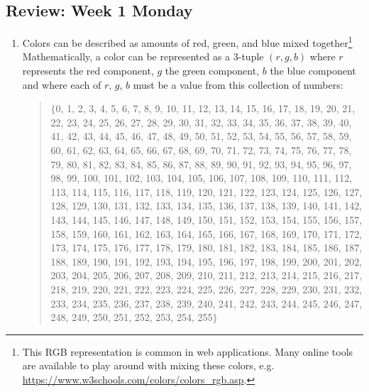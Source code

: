 \documentclass[12pt, oneside]{article}
\begin{document}
\subsection*{Review: Week 1 Monday}
\begin{enumerate}
    \item {

Colors can be described as amounts of red, green, and blue mixed together\footnote{This RGB representation
is common in web applications.  Many online tools are available to play around with mixing these colors, 
e.g. \url{https://www.w3schools.com/colors/colors_rgb.asp}. }
Mathematically, a color can be represented as a $3$-tuple $(r, g, b)$ where $r$
represents the red component, $g$ the green component, $b$ the blue component and where each of $r$, $g$, $b$ must
be a value from this collection of numbers:
\begin{quote}
$\{$0, 1, 2, 3, 4, 5, 6, 7, 8, 9, 10, 11, 12, 13, 14, 15, 16, 17, 18, 19, 20, 21, 22, 23, 24, 25, 26, 27, 28, 29, 30, 31, 32, 33, 34, 35, 36, 37, 38, 39, 40, 41, 42, 43, 44, 45, 46, 47, 48, 49, 50, 51, 52, 53, 54, 55, 56, 57, 58, 59, 60, 61, 62, 63, 64, 65, 66, 67, 68, 69, 70, 71, 72, 73, 74, 75, 76, 77, 78, 79, 80, 81, 82, 83, 84, 85, 86, 87, 88, 89, 90, 91, 92, 93, 94, 95, 96, 97, 98, 99, 100, 101, 102, 103, 104, 105, 106, 107, 108, 109, 110, 111, 112, 113, 114, 115, 116, 117, 118, 119, 120, 121, 122, 123, 124, 125, 126, 127, 128, 129, 130, 131, 132, 133, 134, 135, 136, 137, 138, 139, 140, 141, 142, 143, 144, 145, 146, 147, 148, 149, 150, 151, 152, 153, 154, 155, 156, 157, 158, 159, 160, 161, 162, 163, 164, 165, 166, 167, 168, 169, 170, 171, 172, 173, 174, 175, 176, 177, 178, 179, 180, 181, 182, 183, 184, 185, 186, 187, 188, 189, 190, 191, 192, 193, 194, 195, 196, 197, 198, 199, 200, 201, 202, 203, 204, 205, 206, 207, 208, 209, 210, 211, 212, 213, 214, 215, 216, 217, 218, 219, 220, 221, 222, 223, 224, 225, 226, 227, 228, 229, 230, 231, 232, 233, 234, 235, 236, 237, 238, 239, 240, 241, 242, 243, 244, 245, 246, 247, 248, 249, 250, 251, 252, 253, 254, 255$\}$
\end{quote}

}
\end{enumerate}
\end{document}
